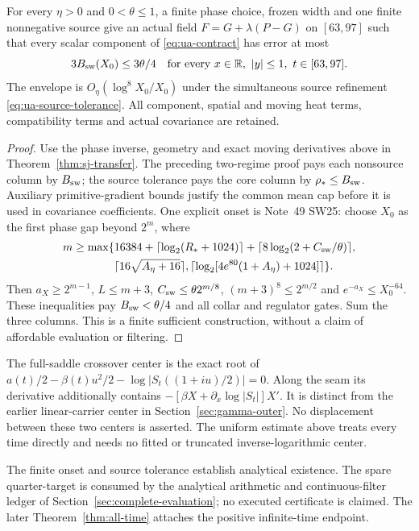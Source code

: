 \begin{theorem}
\label{thm:uniform-switch}
For every $\eta>0$ and $0<\theta\le1$, a finite phase choice, frozen
width and one finite nonnegative source give an actual field
$F=G+\lambda(P-G)$ on $[63,97]$ such that every scalar component of
\eqref{eq:ua-contract} has error at most
\begin{equation}
 3B_{\rm sw}(X_0)\le3\theta/4
 \quad\text{for every }x\in\mathbb R,\ |y|\le1,\ t\in[63,97].
 \label{eq:ua-switch-theorem}
\end{equation}
The envelope is $O_\eta(\log^8X_0/X_0)$ under the simultaneous source
refinement \eqref{eq:ua-source-tolerance}. All component, spatial and
moving heat terms, compatibility terms and actual covariance are retained.
\end{theorem}
\begin{proof}
Use the phase inverse, geometry and exact moving derivatives above in
Theorem~\ref{thm:sj-transfer}. The preceding two-regime proof pays each
nonsource column by $B_{\rm sw}$; the source tolerance pays the core
column by $\rho_*\le B_{\rm sw}$. Auxiliary primitive-gradient bounds
justify the common mean cap before it is used in covariance coefficients.
One explicit onset is Note~49 SW25: choose $X_0$ as the first phase gap
beyond $2^m$, where
\begin{align*}
 m\ge\max\{&16384+\lceil\log_2(R_*+1024)\rceil
                 +\lceil8\log_2(2+C_{\rm sw}/\theta)\rceil,\\
             &\lceil16\sqrt{A_\eta+16}\rceil,
               \lceil\log_2[4e^{80}(1+A_\eta)+1024]\rceil\}.
\end{align*}
Then $a_X\ge2^{m-1}$, $L\le m+3$,
$C_{\rm sw}\le\theta2^{m/8}$,
$(m+3)^8\le2^{m/2}$ and $e^{-a_X}\le X_0^{-64}$.
These inequalities pay $B_{\rm sw}<\theta/4$ and all collar and
regulator gates. Sum the three columns. This is a finite sufficient
construction, without a claim of affordable evaluation or filtering.
\end{proof}

The full-saddle crossover center is the exact root of
$a(t)/2-\beta(t)u^2/2-\log|S_t((1+iu)/2)|=0$.
Along the seam its derivative additionally contains
$-[\beta X+\partial_x\log|S_t|]X'$.
It is distinct from the earlier linear-carrier center in
Section~\ref{sec:gamma-outer}. No displacement between these two
centers is asserted. The uniform estimate above treats every time
directly and needs no fitted or truncated inverse-logarithmic center.

The finite onset and source tolerance establish analytical existence.
The spare quarter-target is consumed by the analytical arithmetic and
continuous-filter ledger of Section~\ref{sec:complete-evaluation}; no
executed certificate is claimed. The later Theorem~\ref{thm:all-time}
attaches the positive infinite-time endpoint.
